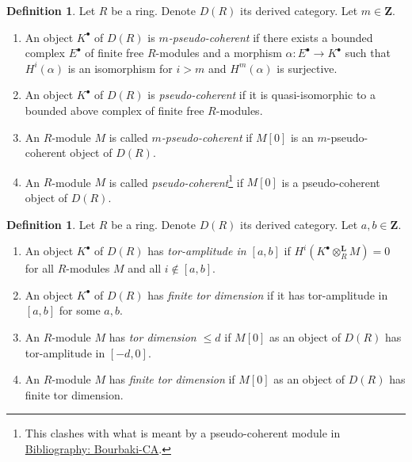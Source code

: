 \documentclass{amsart}
\theoremstyle{plain}
\theoremstyle{definition}
\newtheorem{definition}[subsection]{Definition}
\theoremstyle{remark}
\numberwithin{equation}{subsection}
\begin{document}
\begin{definition}
\label{more-algebra-definition-pseudo-coherent}
Let $R$ be a ring. Denote $D(R)$ its derived category.
Let $m \in \mathbf{Z}$.
\begin{enumerate}
\item An object $K^\bullet$ of $D(R)$ is {\it $m$-pseudo-coherent}
if there exists a bounded complex $E^\bullet$ of finite free $R$-modules
and a morphism $\alpha : E^\bullet \to K^\bullet$ such that
$H^i(\alpha)$ is an isomorphism for $i > m$ and $H^m(\alpha)$
is surjective.
\item An object $K^\bullet$ of $D(R)$ is {\it pseudo-coherent}
if it is quasi-isomorphic to a bounded above complex of finite
free $R$-modules.
\item An $R$-module $M$ is called {\it $m$-pseudo-coherent}
if $M[0]$ is an $m$-pseudo-coherent object of $D(R)$.
\item An $R$-module $M$ is called
{\it pseudo-coherent}\footnote{This clashes with what is meant by
a pseudo-coherent module in \href{https://stacks.math.columbia.edu/bibliography}{Bibliography: Bourbaki-CA}.}
if $M[0]$ is a pseudo-coherent object of $D(R)$.
\end{enumerate}
\end{definition}

\begin{definition}
\label{more-algebra-definition-tor-amplitude}
Let $R$ be a ring. Denote $D(R)$ its derived category.
Let $a, b \in \mathbf{Z}$.
\begin{enumerate}
\item An object $K^\bullet$ of $D(R)$ has
{\it tor-amplitude in $[a, b]$}
if $H^i(K^\bullet \otimes_R^\mathbf{L} M) = 0$ for all $R$-modules
$M$ and all $i \not \in [a, b]$.
\item An object $K^\bullet$ of $D(R)$ has {\it finite tor dimension}
if it has tor-amplitude in $[a, b]$ for some $a, b$.
\item An $R$-module $M$ has {\it tor dimension $\leq d$}
if $M[0]$ as an object of $D(R)$ has tor-amplitude in $[-d, 0]$.
\item An $R$-module $M$ has {\it finite tor dimension}
if $M[0]$ as an object of $D(R)$ has finite tor dimension.
\end{enumerate}
\end{definition}
\end{document}
